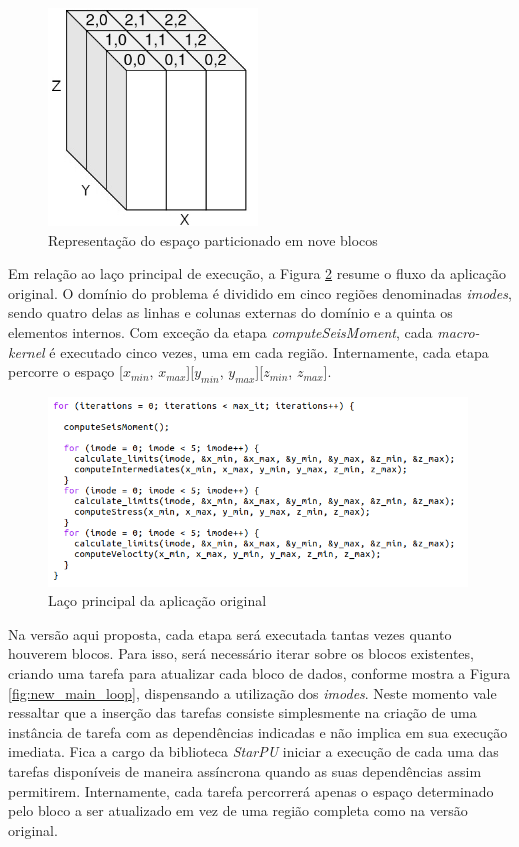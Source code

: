 \documentclass[cic,tc]{iiufrgs}
\begin{document}
\begin{figure}[!htb]
    \caption{Representação do espaço particionado em nove blocos}
    \begin{center}
      \includegraphics[width=15em]{cuboids}
    \end{center}
    \label{fig:cuboids}
\end{figure}

Em relação ao laço principal de execução, a Figura \ref{fig:main_loop} resume o fluxo da aplicação original. O domínio do problema é dividido em cinco regiões denominadas \textit{imodes},
sendo quatro delas as linhas e colunas externas do domínio e a quinta os elementos internos. Com exceção da etapa \textit{computeSeisMoment}, cada \textit{macro-kernel} é executado cinco
vezes, uma em cada região. Internamente, cada etapa percorre o espaço [$x_{min}$, $x_{max}$][$y_{min}$, $y_{max}$][$z_{min}$, $z_{max}$].

\begin{figure}[!htb]
    \caption{Laço principal da aplicação original}
    \begin{center}
      \includegraphics[width=30em]{main_loop}
    \end{center}
    \label{fig:main_loop}
\end{figure}

Na versão aqui proposta, cada etapa será executada tantas vezes quanto houverem blocos. Para isso, será necessário iterar sobre os blocos existentes, criando uma tarefa para atualizar cada bloco
de dados, conforme mostra a Figura \ref{fig:new_main_loop}, dispensando a utilização dos \textit{imodes}. Neste momento vale ressaltar que a inserção das tarefas consiste
simplesmente na criação de uma instância de tarefa com as dependências indicadas e não implica em sua execução imediata. Fica a cargo da biblioteca \textit{StarPU} iniciar a execução
de cada uma das tarefas disponíveis de maneira assíncrona quando as suas dependências assim permitirem. Internamente, cada tarefa percorrerá apenas o espaço determinado pelo bloco a ser
atualizado em vez de uma região completa como na versão original.
\end{document}
